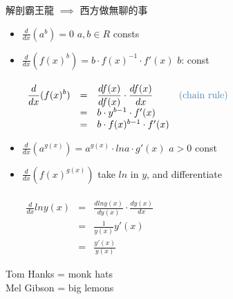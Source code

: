 \begin{jk}
解剖霸王龍 $\implies$ 西方做無聊的事
\end{jk}
\begin{notn}
\begin{itemize}
\item $\displaystyle \frac{d}{dx} (a^b) = 0$ \quad $a, b \in R$ consts
\item $\displaystyle \frac{d}{dx}(f(x)^b) = b \cdot f(x)^{-1} \cdot f'(x)$ \quad $b$: const\\\\
$\begin{array}{rcll}
\displaystyle \frac{d}{dx} (f(x)^b) & = & \displaystyle \frac{df(x)}{df(x)} \cdot \frac{df(x)}{dx} & \tssteelblue{(\text{chain rule})}\\
& = & b \cdot y^{b-1} \cdot f'(x)\\
& = & b \cdot f(x)^{b-1} \cdot f'(x)
\end{array}$
\item $\displaystyle \frac{d}{dx}(a^{g(x)}) = a^{g(x)} \cdot ln a \cdot g'(x)$ \quad $a > 0$ const 
\item $\displaystyle \frac{d}{dx}(f(x)^{g(x)})$ \quad take $ln$ in $y$, and differentiate\\\\
$\begin{array}{rcl}
\displaystyle \frac{d}{dx} lny(x) & = & \displaystyle \frac{d lny(x)}{dy(x)} \cdot \frac{dy(x)}{dx}\\
& = & \displaystyle \frac{1}{y(x)} y'(x)\\
& = & \displaystyle \frac{y'(x)}{y(x)}
\end{array}$
\end{itemize}
\end{notn}
\begin{jk}[Anagram]
Tom Hanks = monk hats \\
Mel Gibson = big lemons
\end{jk}

